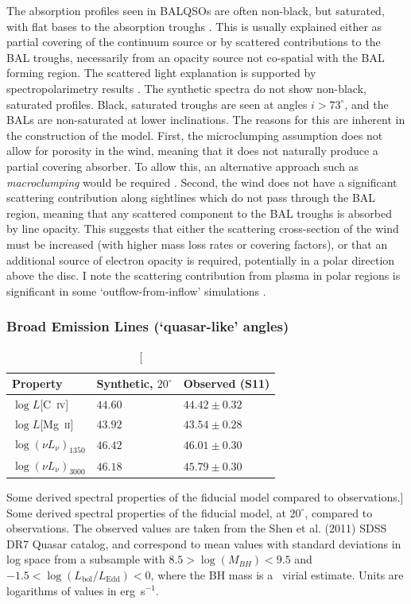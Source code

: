 The absorption profiles seen in BALQSOs are often non-black, but saturated, 
with flat bases to the absorption troughs \citep{arav1999b,arav1999a}.
This is usually explained either as  partial covering of the continuum
source or by scattered contributions to the BAL troughs, necessarily
from an opacity source not co-spatial with the BAL forming region.
The scattered light explanation is supported by spectropolarimetry results
\citep{lamy2000}. The synthetic spectra do not show non-black, saturated profiles.
Black, saturated troughs are seen at angles $i > 73^\circ$, and the BALs
are non-saturated at lower inclinations. The reasons for this are inherent 
in the construction of the model. 
First, the microclumping assumption does not allow for 
porosity in the wind, meaning that it does not naturally produce
a partial covering absorber. To allow this, an alternative approach
such as {\em macroclumping} would be required \citep[e.g.][]{hamann2008,surlan2012}.
Second, the wind does not have a significant scattering contribution 
along sightlines which do not pass through the BAL region,
meaning that any scattered component to the BAL troughs is absorbed by line opacity.
This suggests that either the scattering cross-section of the wind must
be increased (with higher mass loss rates or covering factors), or 
that an additional source of electron opacity is required, potentially
in a polar direction above the disc. I note the scattering contribution
from plasma in polar regions is significant in some `outflow-from-inflow'
simulations \citep{KP09, simproga2012}.

\subsubsection{Broad Emission Lines (`quasar-like' angles)}

\begin{table}
\centering
\begin{tabular}{p{2cm}p{2cm}p{3cm}}
\hline Property & Synthetic, $20^\circ$ & Observed  (S11) \\ 
\hline \hline
$\log L$[C~\textsc{iv}]  & $44.60$ & $44.42 \pm 0.32$  \\
$\log L$[Mg~\textsc{ii}] & $43.92$ & $43.54 \pm 0.28$  \\
$\log (\nu L_{\nu})_{1350}$  & $46.42$ & $46.01 \pm 0.30$ \\
$\log (\nu L_{\nu})_{3000}$  & $46.18$ & $45.79 \pm 0.30$ \\
\hline
\end{tabular}
\caption
[Some derived spectral properties of the fiducial model compared to observations.]
{
Some derived spectral properties of the fiducial model, at $20^\circ$,
compared to observations. The observed values are taken from the Shen et al. (2011)
SDSS DR7 Quasar catalog, and correspond to mean values with standard deviations in log space
from a subsample with $8.5>\log(M_{BH})<9.5$ and 
$-1.5<\log (L_{\mathrm{bol}}/L_{\mathrm{Edd}}) < 0$,
where the BH mass is a \civ\ virial estimate. 
Units are logarithms of values in erg~s$^{-1}$.
}
\label{line_lums}
\end{table}

